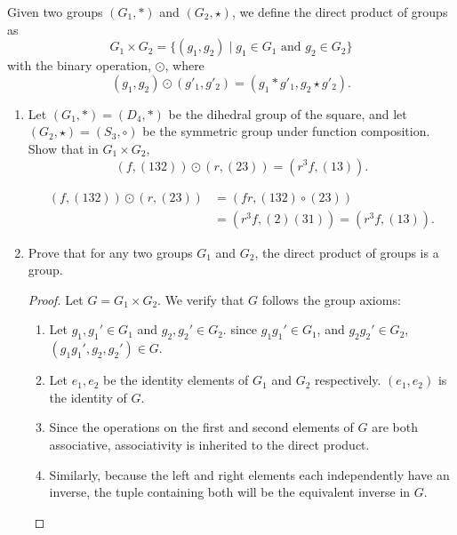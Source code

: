 \documentclass{article}
\begin{document}
\begin{enumerate}
{        Given two groups \((G_1,*)\) and \((G_2,\star)\), we define the direct product of groups as \[           G_1 \times G_2 = \{(g_1, g_2) \mid g_1 \in G_1 \text{ and } g_2 \in G_2\}         \] with the binary operation, \(\odot\), where \[           (g_1, g_2)\odot(g'_1,g'_2) = (g_1 * g'_1, g_2 \star g'_2).         \]
      
        \begin{enumerate}
            \item {
                Let \({(G_1, *) = (D_4, *)}\) be the dihedral group of the square, 
                and let \({(G_2, \star) = (S_3, \circ)}\) be the symmetric group 
                under function composition.  Show that in \(G_1 \times G_2\), 
                \[\left(f, (132) \right) \odot \left(r, (23) \right) = \left(r^3f, (13) \right).\]

                \begin{align}
                    \left(f, (132) \right) \odot \left(r, (23) \right) 
                        &= (fr, (132) \circ (23)) \\
                        & = (r^3f, (2)(31)) = (r^3f, (13)).
                \end{align}
            }
            
            \item {
                Prove that for any two groups \(G_1\) and \(G_2\), the direct product of groups is a group.
                
                \begin{proof}
                    Let \(G = G_1 \times G_2\). We verify that \(G\) follows the group 
                    axioms:
                    \begin{enumerate}
                        \item[Closure:] {
                            Let \(g_1, g_1' \in G_1\) and \(g_2, g_2' \in G_2\).
                            since \(g_1g_1' \in G_1\), and \(g_2g_2' \in G_2\),
                            \((g_1g_1', g_2,g_2') \in G\).
                        }
                        \item[Identity:] {
                            Let \(e_1, e_2\) be the identity elements of \(G_1\) 
                            and \(G_2\) respectively. \((e_1, e_2)\) is the identity
                            of \(G\).
                        }
                        \item[Associativity:] {
                            Since the operations on the first and second elements of 
                            \(G\) are both associative, associativity is inherited 
                            to the direct product.
                        }
                        \item[Inverse:] {
                            Similarly, because the left and right elements each 
                            independently have an inverse, the tuple containing 
                            both will be the equivalent inverse in \(G\).
                        }
                    \end{enumerate}
                \end{proof}
            }


\end{enumerate}}
\end{enumerate}
\end{document}
